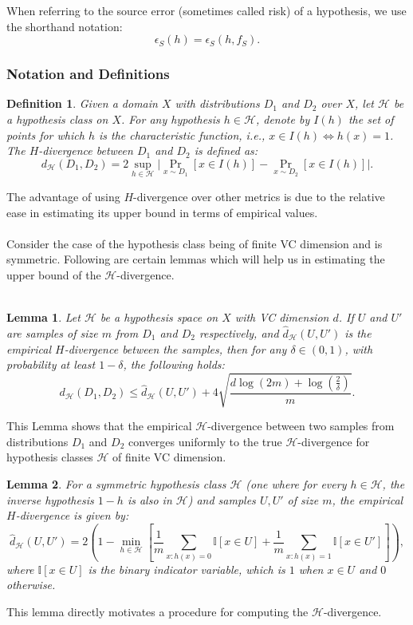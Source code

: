 \documentclass{article}
\newtheorem{definition}{Definition}
\newtheorem{lemma}{Lemma}
\begin{document}
When referring to the source error (sometimes called risk) of a hypothesis, we use the shorthand notation:
\[
\epsilon_S(h) = \epsilon_S(h, f_S).
\]

\subsubsection{Notation and Definitions}
\begin{definition}
    Given a domain $X$ with distributions $D_1$ and $D_2$ over $X$, let $\mathcal{H}$ be a hypothesis class on $X$. For any hypothesis $h \in \mathcal{H}$, denote by $I(h)$ the set of points for which $h$ is the characteristic function, i.e., $x \in I(h) \iff h(x) = 1$. The $H$-divergence between $D_1$ and $D_2$ is defined as:
    \[
    d_{\mathcal{H}}(D_1, D_2) = 2 \sup_{h \in \mathcal{H}} \big| \Pr_{x \sim D_1}[x \in I(h)] - \Pr_{x \sim D_2}[x \in I(h)] \big|.
    \]
\end{definition}
The advantage of using $H$-divergence over other metrics is due to the relative ease in estimating its upper bound in terms of empirical values. 
\\
\\
Consider the case of the hypothesis class being of finite VC dimension and is symmetric. Following are certain lemmas which will help us in estimating the upper bound of the $\mathcal{H}$-divergence. 
\\
\\
\begin{lemma}
Let $\mathcal{H}$ be a hypothesis space on $X$ with VC dimension $d$. If $U$ and $U'$ are samples of size $m$ from $D_1$ and $D_2$ respectively, and $\hat{d}_{\mathcal{H}}(U, U')$ is the empirical $H$-divergence between the samples, then for any $\delta \in (0,1)$, with probability at least $1 - \delta$, the following holds:
\[
d_{\mathcal{H}}(D_1, D_2) \leq \hat{d}_{\mathcal{H}}(U, U') + 4 \sqrt{\frac{d \log(2m) + \log\left(\frac{2}{\delta}\right)}{m}}.
\]
\end{lemma}
This Lemma shows that the empirical $\mathcal{H}$-divergence between two samples from distributions
$D_1$ and $D_2$ converges uniformly to the true $\mathcal{H}$-divergence for hypothesis classes $\mathcal{H}$ of finite VC dimension.
\begin{lemma}
For a symmetric hypothesis class $\mathcal{H}$ (one where for every $h \in \mathcal{H}$, the inverse hypothesis $1 - h$ is also in $\mathcal{H}$) and samples $U, U'$ of size $m$, the empirical $H$-divergence is given by:
\[
\hat{d}_{\mathcal{H}}(U, U') = 2 \left( 1 - \min_{h \in \mathcal{H}} \left[ \frac{1}{m} \sum_{x : h(x) = 0} \mathbb{I}[x \in U] + \frac{1}{m} \sum_{x : h(x) = 1} \mathbb{I}[x \in U'] \right] \right),
\]
where $\mathbb{I}[x \in U]$ is the binary indicator variable, which is $1$ when $x \in U$ and $0$ otherwise.
\end{lemma}
This lemma directly motivates a procedure for computing the $\mathcal{H}$-divergence.
\end{document}
